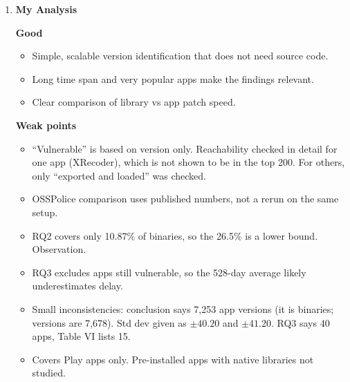 \documentclass[11pt,a4paper]{article}
\newcommand{\entrypart}[1]{\textbf{\color{accent}#1}\par\vspace{2pt}}
\begin{document}
\begin{enumerate}
    \vspace{4pt}
    \textbf{Limitations (authors)}
    \begin{itemize}
        \item Only top 200 apps (Google Play limit).
        \item Unknown libraries not in the known set get matched to the closest one.
        \item AndroZoo timestamps may lag (max 9 days).
        \item Vulnerability labels come from CVE data.
        \item Exploitability shown for one app only. Full native reachability analysis is an open problem.
        \item Developers might patch manually without changing the version. Patch-level versions identified correctly for 61.21\%.
    \end{itemize}

    \item \entrypart{My Analysis}

    \textbf{Good}
    \begin{itemize}
        \item Simple, scalable version identification that does not need source code.
        \item Long time span and very popular apps make the findings relevant.
        \item Clear comparison of library vs app patch speed.
    \end{itemize}

    \vspace{4pt}
    \textbf{Weak points}
    \begin{itemize}
        \item ``Vulnerable'' is based on version only. Reachability checked in detail for one app (XRecoder), which is not shown to be in the top 200. For others, only ``exported and loaded'' was checked.
        \item OSSPolice comparison uses published numbers, not a rerun on the same setup.
        \item RQ2 covers only 10.87\% of binaries, so the 26.5\% is a lower bound. Observation.
        \item RQ3 excludes apps still vulnerable, so the 528-day average likely underestimates delay.
        \item Small inconsistencies: conclusion says 7,253 app versions (it is binaries; versions are 7,678). Std dev given as $\pm40.20$ and $\pm41.20$. RQ3 says 40 apps, Table VI lists 15.
        \item Covers Play apps only. Pre-installed apps with native libraries not studied.
    \end{itemize}


\end{enumerate}
\end{document}
